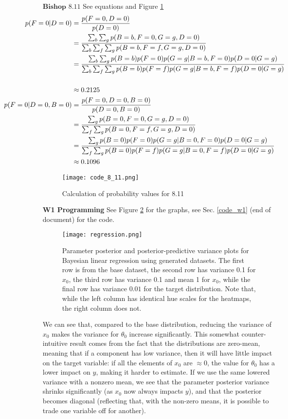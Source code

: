 \documentclass[11pt]{article} %
\begin{document}
\begin{enumerate}
\newpage
\item[$\textbf{Bishop }8.11$] See equations and Figure \ref{code_8_11} \begin{align*}
	\hspace{-2cm}p(F=0|D=0)
	&= \frac{p(F=0,D=0)}{p(D=0)} \\
	&= \frac{\sum_b\sum_g p(B=b,F=0,G=g,D=0)}{\sum_b \sum_f \sum_g p(B=b,F=f,G=g,D=0)} \\
	&= \frac{\sum_b\sum_g p(B=b)p(F=0)p(G=g|B=b,F=0)p(D=0|G=g)}{\sum_b \sum_f \sum_g p(B=b)p(F=f)p(G=g|B=b,F=f)p(D=0|G=g)} \\[0.5cm]
	&\approx 0.2125\\
	\hspace{-2cm}p(F=0|D=0,B=0)
	&= \frac{p(F=0,D=0,B=0)}{p(D=0,B=0)} \\
	&= \frac{\sum_g p(B=0,F=0,G=g,D=0)}{ \sum_f \sum_g p(B=0,F=f,G=g,D=0)} \\
	&= \frac{\sum_g p(B=0)p(F=0)p(G=g|B=0,F=0)p(D=0|G=g)}{\sum_f \sum_g p(B=0)p(F=f)p(G=g|B=0,F=f)p(D=0|G=g)} \\
	&\approx 0.1096\\
\end{align*}
\begin{figure}[h!]
  \center
  \texttt{[image: code\_8\_11.png]}
  \caption{Calculation of probability values for 8.11}
  \label{code_8_11}
\end{figure}
\item[\textbf{W1 Programming}] See Figure \ref{regression} for the graphs, see Sec. \ref{code_w1} (end of document) for the code.

\newpage

\begin{figure}[h!]
\center
  \texttt{[image: regression.png]}
  \caption{Parameter posterior and posterior-predictive variance plots for Bayesian linear regression using generated datasets. The first row is from the base dataset, the second row has variance 0.1 for $x_0$, the third row has variance 0.1 and mean 1 for $x_0$, while the final row has variance $0.01$ for the target distribution. Note that, while the left column has identical hue scales for the heatmaps, the right column does not.}
  \label{regression}
\end{figure}
\restoregeometry
\newpage

We can see that, compared to the base distribution, reducing the variance of $x_0$ makes the variance for $\theta_0$ increase significantly.
This somewhat counter-intuitive result comes from the fact that the distributions are zero-mean, meaning that if a component has low variance,
then it will have little impact on the target variable: if all the elements of $x_0$ are $\approx 0$, the value for $\theta_0$ has a lower impact
on $y$, making it harder to estimate.
If we use the same lowered variance with a nonzero mean, we see that the parameter posterior variance shrinks significantly (as $x_0$ now always impacts $y$),
and that the posterior becomes diagonal (reflecting that, with the non-zero means, it is possible to trade one variable off for another).


\end{enumerate}
\end{document}
